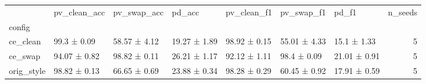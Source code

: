 \begin{tabular}{lllllllr}
\toprule
 & pv_clean_acc & pv_swap_acc & pd_acc & pv_clean_f1 & pv_swap_f1 & pd_f1 & n_seeds \\
config &  &  &  &  &  &  &  \\
\midrule
ce_clean & 99.3 ± 0.09 & 58.57 ± 4.12 & 19.27 ± 1.89 & 98.92 ± 0.15 & 55.01 ± 4.33 & 15.1 ± 1.33 & 5 \\
ce_swap & 94.07 ± 0.82 & 98.82 ± 0.11 & 26.21 ± 1.17 & 92.12 ± 1.11 & 98.4 ± 0.09 & 21.01 ± 0.91 & 5 \\
orig_style & 98.82 ± 0.13 & 66.65 ± 0.69 & 23.88 ± 0.34 & 98.28 ± 0.29 & 60.45 ± 0.92 & 17.91 ± 0.59 & 5 \\
\bottomrule
\end{tabular}

